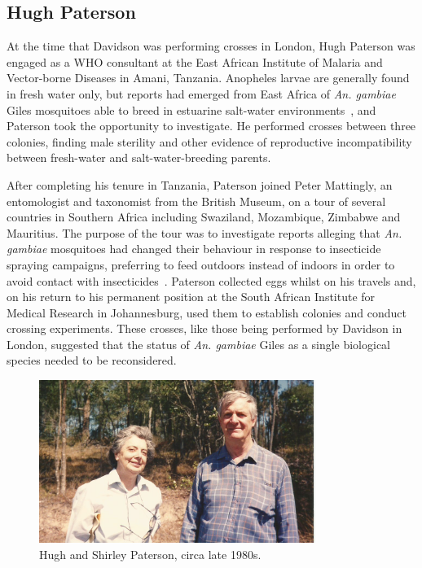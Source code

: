 \documentclass[a4paper,11pt,abstracton,hidelinks]{scrartcl}
\begin{document}
\subsection{Hugh Paterson}\label{subsec:hugh-paterson}

At the time that Davidson was performing crosses in London, Hugh Paterson was engaged as a WHO consultant at the East African Institute of Malaria and Vector-borne Diseases in Amani, Tanzania.
%
Anopheles larvae are generally found in fresh water only, but reports had emerged from East Africa of \textit{An. gambiae} Giles mosquitoes able to breed in estuarine salt-water environments~\parencite{DeMeillon1947,MuirheadThomson1948}, and Paterson took the opportunity to investigate.
%
He performed crosses between three colonies, finding male sterility and other evidence of reproductive incompatibility between fresh-water and salt-water-breeding parents.

After completing his tenure in Tanzania, Paterson joined Peter Mattingly, an entomologist and taxonomist from the British Museum, on a tour of several countries in Southern Africa including Swaziland, Mozambique, Zimbabwe and Mauritius.
%
The purpose of the tour was to investigate reports alleging that \textit{An. gambiae} mosquitoes had changed their behaviour in response to insecticide spraying campaigns, preferring to feed outdoors instead of indoors in order to avoid contact with insecticides~\parencite{Mattingly1963}.
%
Paterson collected eggs whilst on his travels and, on his return to his permanent position at the South African Institute for Medical Research in Johannesburg, used them to establish colonies and conduct crossing experiments.
%
These crosses, like those being performed by Davidson in London, suggested that the status of \textit{An. gambiae} Giles as a single biological species needed to be reconsidered.


\begin{figure}[t]
\centering
\includegraphics[width=0.8\textwidth]{artwork/chapter2/Hugh_and_Shirley_Paterson_Brisbane.jpg}
\caption{Hugh and Shirley Paterson, circa late 1980s.}
\label{fig:patersons}
\end{figure}
\end{document}
